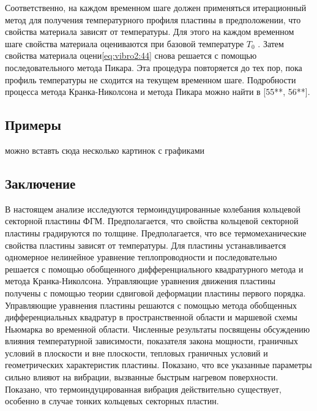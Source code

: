 Соответственно, на каждом временном шаге должен применяться итерационный метод для получения температурного профиля пластины в предположении, что свойства материала зависят от температуры. Для этого на каждом временном шаге свойства материала оцениваются при базовой температуре \(T_0\) . Затем свойства материала оцени\cref{eq:vibro2:44} снова решается с помощью последовательного метода Пикара.  Эта процедура повторяется до тех пор, пока профиль температуры не сходится на текущем временном шаге. Подробности процесса метода Кранка-Николсона и метода Пикара можно найти в [55**, 56**].


\subsection{Примеры}\label{ch:ch3/sec3/sub4}
{\color{blue} можно вставть сюда несколько картинок с графиками}

\subsection{Заключение}\label{ch:ch3/sec3/sub4}

В настоящем анализе исследуются термоиндуцированные колебания кольцевой секторной пластины ФГМ. Предполагается, что свойства кольцевой секторной пластины градируются по толщине. Предполагается, что все термомеханические свойства пластины зависят от температуры.  Для пластины устанавливается одномерное нелинейное уравнение теплопроводности и последовательно решается с помощью обобщенного дифференциального квадратурного метода и метода Кранка-Николсона. Управляющие уравнения движения пластины получены с помощью теории сдвиговой деформации пластины первого порядка. Управляющие уравнения пластины решаются с помощью метода обобщенных дифференциальных квадратур в пространственной области и маршевой схемы Ньюмарка во временной области. Численные результаты посвящены обсуждению влияния температурной зависимости, показателя закона мощности, граничных условий в плоскости и вне плоскости, тепловых граничных условий и геометрических характеристик пластины. Показано, что все указанные параметры сильно влияют на вибрации, вызванные быстрым нагревом поверхности. Показано, что термоиндуцированная вибрация действительно существует, особенно в случае тонких кольцевых секторных пластин.